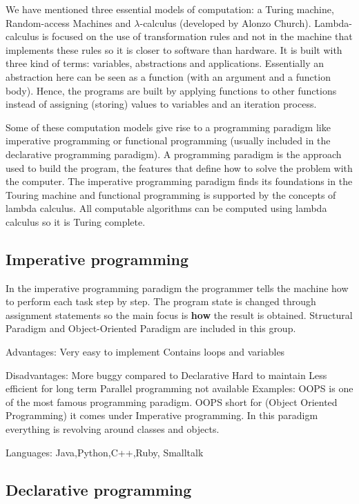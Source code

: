 We have mentioned three essential models of computation: a Turing machine, Random-access Machines and $\lambda$-calculus (developed by Alonzo Church).
Lambda-calculus is focused on the use of transformation rules and not in the machine that implements these rules so it is closer to software than hardware.
It is built with three kind of terms: variables, abstractions and applications. 
Essentially an abstraction here can be seen as a function (with an argument and a function body). 
Hence, the programs are built by applying functions to other functions instead of assigning (storing) values to variables and an iteration process. 

Some of these computation models give rise to a programming paradigm like imperative programming or functional programming (usually included in the declarative programming paradigm).
A programming paradigm is the approach used to build the program, the features that define how to solve the problem with the computer. 
The imperative programming paradigm finds its foundations in the Touring machine and functional programming is supported by the concepts of lambda calculus. 
All computable algorithms can be computed using lambda calculus so it is Turing complete.



    \subsection*{Imperative programming}
    
In the imperative programming paradigm the programmer tells the machine how to perform each task step by step. 
The program state is changed through assignment statements so the main focus is \textbf{how} the result is obtained. 
Structural Paradigm and Object-Oriented Paradigm are included in this group. 

Advantages:
Very easy to implement
Contains loops and variables

Disadvantages:
More buggy compared to Declarative
Hard to maintain
Less efficient for long term
Parallel programming not available
Examples:
OOPS is one of the most famous programming paradigm. OOPS short for (Object Oriented Programming) it comes under Imperative programming. In 
this paradigm everything is revolving around classes and objects.

Languages: Java,Python,C++,Ruby, Smalltalk


    \subsection*{Declarative programming}

